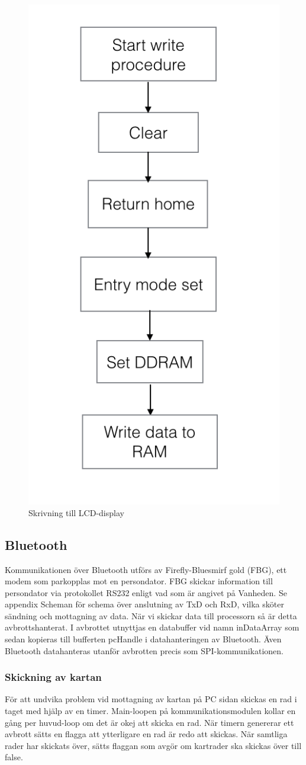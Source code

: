 \documentclass[a4paper,12pt,fleqn]{article}
\begin{document}
\begin{figure}[htp] %
  \begin{center}
  \includegraphics[keepaspectratio=true,width=0.5\linewidth]{bilder/write}  %
  \end{center}
  \caption{Skrivning till LCD-display} %
  \label{fig:flowlcdwrite}
\end{figure}

\subsection{Bluetooth}
Kommunikationen över Bluetooth utförs av Firefly-Bluesmirf gold (FBG), ett modem som parkopplas mot en persondator.
FBG skickar information till persondator via protokollet RS232 enligt vad som är angivet på Vanheden. 
Se appendix Scheman för schema över anslutning av TxD och RxD, vilka sköter sändning och mottagning av data.
När vi skickar data till processorn så är detta avbrottshanterat. I avbrottet utnyttjas en databuffer vid namn inDataArray som sedan kopieras till bufferten pcHandle i datahanteringen av Bluetooth. Även Bluetooth datahanteras utanför avbrotten precis som SPI-kommunikationen.

\subsubsection{Skickning av kartan}
För att undvika problem vid mottagning av kartan på PC sidan skickas en rad i taget med hjälp av en timer. Main-loopen på kommunikationsmodulen kollar en gång per huvud-loop om det är okej att skicka en rad. När timern genererar ett avbrott sätts en flagga att ytterligare en rad är redo att skickas. När samtliga rader har skickats över, sätts flaggan som avgör om kartrader ska skickas över till false.
\end{document}
